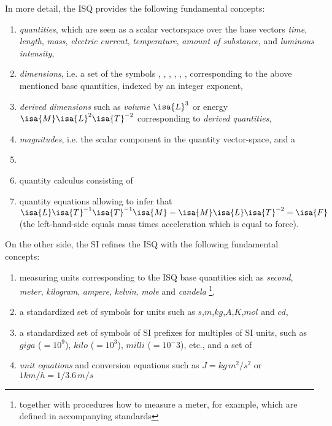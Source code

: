 \documentclass[11pt,a4paper]{book}
\begin{document}
In more detail, the ISQ provides the following fundamental concepts:
%
\begin{enumerate}%
\item \emph{quantities}, which are seen as a scalar vectorspace over the base vectors
      \emph{time}, \emph{length}, \emph{mass}, \emph{electric current},
      \emph{temperature}, \emph{amount of substance}, and \emph{luminous intensity},
 
\item \emph{dimensions}, i.e. a set of the symbols  , , , ,  
      \isa{{\isasymTheta}}, ,   corresponding to the above mentioned base 
      quantities, indexed by an integer exponent,

\item \emph{derived dimensions} such as \emph{volume} $\isa{L}^3$ or energy 
      $\isa{M}\isa{L}^2\isa{T}^{-2}$ corresponding to \emph{derived quantities}, 

\item \emph{magnitudes}, i.e. the scalar component in the quantity vector-space, and a

\item \item{quantity calculus} consisting of \item{quantity equations} allowing to infer that 
      $\isa{L}\isa{T}^{-1}\isa{T}^{-1}\isa{M} = \isa{M}\isa{L}\isa{T}^{-2} = \isa{F} $ 
      (the left-hand-side equals mass times acceleration which is equal to force). 
\end{enumerate}

On the other side, the SI refines the ISQ with the following fundamental concepts:
\begin{enumerate}%
\item measuring units corresponding to the ISQ base quantities sich
      as \emph{second}, \emph{meter}, \emph{kilogram}, \emph{ampere}, \emph{kelvin}, \emph{mole} and
      \emph{candela} \footnote{together with procedures how to measure a meter, for example, which are
      defined in accompanying standards},
\item a standardized set of symbols for units such as $s$,$m$,$kg$,$A$,$K$,$mol$ and $cd$,
\item a standardized set of symbols of SI prefixes for multiples of SI units, such as 
      $giga$ ($=10^9$), $kilo$ ($=10^3$), $milli$ ($=10^-3$), etc., and a set of
\item \emph{unit equations} and conversion equations such as $J = kg\,m^2/s^2$ or $1 km/h = 1/3.6\,m/s$

\end{enumerate}
\end{document}
